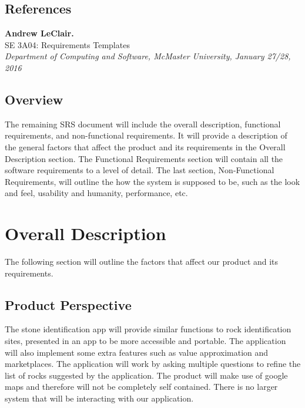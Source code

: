 \documentclass[titlepage]{article}
\begin{document}
\subsection{References}
\textbf{Andrew LeClair.}\\
SE 3A04: Requirements Templates\\
\textit{Department of Computing and Software, McMaster University, January 27/28, 2016}
\subsection{Overview}
The remaining SRS document will include the overall description, functional requirements, and non-functional requirements. It will provide a description of the general factors that affect the product and its requirements in the Overall Description section. The Functional Requirements section will contain all the software requirements to a level of detail. The last section, Non-Functional Requirements, will outline the how the system is supposed to be, such as the look and feel, usability and humanity, performance, etc. 




\section{Overall Description}
The following section will outline the factors that affect our product and its requirements.\\

\subsection{Product Perspective}
The stone identification app will provide similar functions to rock identification sites, presented in an app to be more accessible and portable. The application will also implement some extra features such as value approximation and marketplaces. The application will work by asking multiple questions to refine the list of rocks suggested by the application. The product will make use of google maps and therefore will not be completely self contained. 
There is no larger system that will be interacting with our application.\\
\end{document}
